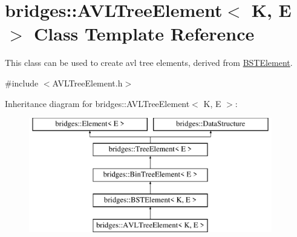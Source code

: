 \hypertarget{classbridges_1_1_a_v_l_tree_element}{}\section{bridges\+::A\+V\+L\+Tree\+Element$<$ K, E $>$ Class Template Reference}
\label{classbridges_1_1_a_v_l_tree_element}


This class can be used to create avl tree elements, derived from \mbox{\hyperlink{classbridges_1_1_b_s_t_element}{B\+S\+T\+Element}}.  




{\ttfamily \#include $<$A\+V\+L\+Tree\+Element.\+h$>$}

Inheritance diagram for bridges\+::A\+V\+L\+Tree\+Element$<$ K, E $>$\+:\begin{figure}[H]
\begin{center}
\leavevmode
\includegraphics[height=5.000000cm]{classbridges_1_1_a_v_l_tree_element}
\end{center}
\end{figure}
